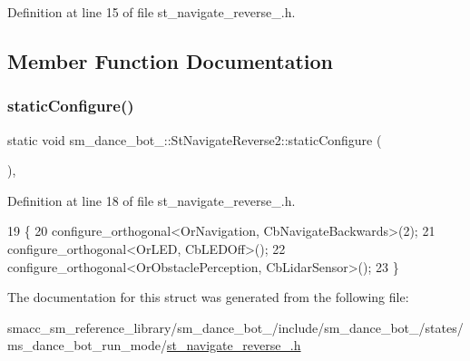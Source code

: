 Definition at line 15 of file st\+\_\+navigate\+\_\+reverse\+\_.\+h.



\subsection{Member Function Documentation}
\mbox{\label{structsm__dance__bot__2_1_1StNavigateReverse2_acef3a24cf17f19e5732fef608bc323a1}} 
\subsubsection{\texorpdfstring{static\+Configure()}{staticConfigure()}}
{\footnotesize\ttfamily static void sm\+\_\+dance\+\_\+bot\+\_\+::\+St\+Navigate\+Reverse2\+::static\+Configure (\begin{DoxyParamCaption}{ }\end{DoxyParamCaption})\hspace{0.3cm}{\ttfamily [inline]}, {\ttfamily [static]}}



Definition at line 18 of file st\+\_\+navigate\+\_\+reverse\+\_.\+h.


\begin{DoxyCode}
19    \{
20       configure\_orthogonal<OrNavigation, CbNavigateBackwards>(2);
21       configure\_orthogonal<OrLED, CbLEDOff>();
22       configure\_orthogonal<OrObstaclePerception, CbLidarSensor>();
23    \}
\end{DoxyCode}


The documentation for this struct was generated from the following file\+:\begin{DoxyCompactItemize}
\item 
smacc\+\_\+sm\+\_\+reference\+\_\+library/sm\+\_\+dance\+\_\+bot\+\_/include/sm\+\_\+dance\+\_\+bot\+\_/states/ms\+\_\+dance\+\_\+bot\+\_\+run\+\_\+mode/\hyperlink{sm__dance__bot__2_2include_2sm__dance__bot__2_2states_2ms__dance__bot__run__mode_2st__navigate__reverse__2_8h}{st\+\_\+navigate\+\_\+reverse\+\_.\+h}\end{DoxyCompactItemize}
